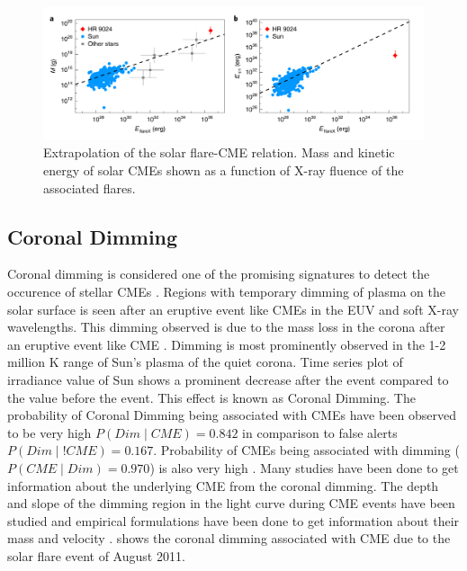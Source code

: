 \begin{figure}[ht]
    \centering
    \includegraphics[width=\textwidth]{images/stellar_cme_energy_mass_relation.png}
    \caption[Extrapolation of Solar flare-CME relation]{Extrapolation of the solar flare-CME relation. Mass and kinetic energy of solar CMEs shown as a function of X-ray fluence of the associated flares. }
    \label{fig:stellar_cme_energy_mass_relation}
\end{figure}


\subsection{Coronal Dimming}

Coronal dimming is considered one of the promising signatures to detect the occurence of stellar CMEs \citep{Namekata2022-dm}. Regions with temporary dimming of plasma on the solar surface is seen after an eruptive event like CMEs in the EUV and soft X-ray wavelengths. This dimming observed is due to the mass loss in the corona after an eruptive event like CME \citep{Mason2014}. Dimming is most prominently observed in the 1-2 million K range of Sun's plasma of the quiet corona. Time series plot of irradiance value of Sun shows a prominent decrease after the event compared to the value before the event. This effect is known as Coronal Dimming. The probability of Coronal Dimming being associated with CMEs have been observed to be very high $P(Dim \mid CME) = 0.842$ in comparison to false alerts $P(Dim \mid !CME) = 0.167$. Probability of CMEs being associated with dimming ($P(CME \mid Dim) = 0.970$) is also very high \citep{Veronig2021-rf}. Many studies have been done to get information about the underlying CME from the coronal dimming. The depth and slope of the dimming region in the light curve during CME events have been studied and empirical formulations have been done to get information about their mass and velocity \citep{Mason2016}.  shows the coronal dimming associated with CME due to the solar flare event of  August 2011.

